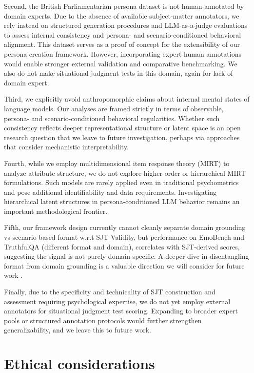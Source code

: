 \documentclass[11pt]{article}
\begin{document}
Second, the British Parliamentarian persona dataset is not human-annotated by domain experts. Due to the absence of available subject-matter annotators, we rely instead on structured generation procedures and LLM-as-a-judge evaluations to assess internal consistency and persona- and scenario-conditioned behavioral alignment. This dataset serves as a proof of concept for the extensibility of our persona creation framework. However, incorporating expert human annotations would enable stronger external validation and comparative benchmarking. We also do not make situational judgment tests in this domain, again for lack of domain expert.

Third, we explicitly avoid anthropomorphic claims about internal mental states of language models. Our analyses are framed strictly in terms of observable, persona- and scenario-conditioned behavioral regularities. Whether such consistency reflects deeper representational structure or latent space is an open research question that we leave to future investigation, perhaps via approaches that consider mechanistic interpretability.

Fourth, while we employ multidimensional item response theory (MIRT) to analyze attribute structure, we do not explore higher-order or hierarchical MIRT formulations. Such models are rarely applied even in traditional psychometrics and pose additional identifiability and data requirements. Investigating hierarchical latent structures in persona-conditioned LLM behavior remains an important methodological frontier. 

Fifth, our framework design currently cannot cleanly separate domain grounding vs scenario-based format w.r.t SJT Validity, but performance on EmoBench and TruthfulQA (different format and domain),  correlates with SJT-derived scores, suggesting the signal is not purely domain-specific. A deeper dive in disentangling format from domain grounding is a valuable direction we will consider for future work .

Finally, due to the specificity and technicality of SJT construction and assessment requiring psychological expertise, we do not yet employ external annotators for situational judgment test scoring. Expanding to broader expert pools or structured annotation protocols would further strengthen generalizability, and we leave this to future work.


\section{Ethical considerations}
\end{document}
